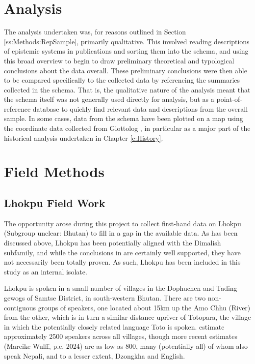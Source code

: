\section{Analysis}\label{s:Methods:Analysis}
The analysis undertaken was, for reasons outlined in Section \ref{ss:Methods:RepSample}, primarily qualitative. This involved reading descriptions of epistemic systems in publications and sorting them into the schema, and using this broad overview to begin to draw preliminary theoretical and typological conclusions about the data overall. These preliminary conclusions were then able to be compared specifically to the collected data by referencing the summaries collected in the schema. That is, the qualitative nature of the analysis meant that the schema itself was not generally used directly for analysis, but as a point-of-reference database to quickly find relevant data and descriptions from the overall sample. In some cases, data from the schema have been plotted on a map using the coordinate data collected from Glottolog \cite{glottolog}, in particular as a major part of the historical analysis undertaken in Chapter \ref{c:History}.

\section{Field Methods}\label{s:Methods:FieldMethods}
\subsection{Lhokpu Field Work}
The opportunity arose during this project to collect first-hand data on Lhokpu (Subgroup unclear: Bhutan) to fill in a gap in the available data. As has been discussed above, Lhokpu has been potentially aligned with the Dimalish subfamily, and while the conclusions in  are certainly well supported, they have not necessarily been totally proven. As such, Lhokpu has been included in this study as an internal isolate.

Lhokpu is spoken in a small number of villages in the Dophuchen and Tading gewogs of Samtse District, in  south-western Bhutan. There are two non-contiguous groups of speakers, one located about 15km up the Amo Chhu (River) from the other, which is in turn a similar distance upriver of Totopara, the village in which the potentially closely related language Toto is spoken.  estimate approximately 2500 speakers across all villages, though more recent estimates (Mareike Wulff, p.c. 2024) are as low as 800, many (potentially all) of whom also speak Nepali, and to a lesser extent, Dzongkha and English.

